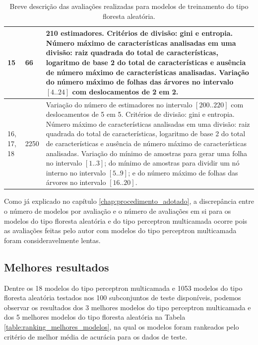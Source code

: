 \begin{table}[ht!]
\begin{center}
{\begin{tabular}{|p{1.5cm}|p{2cm}|p{12cm}|}
    \hline
    15 & 66 & 210 estimadores. Critérios de divisão: gini e entropia. Número máximo de características analisadas em uma divisão: raiz quadrada do total de características, logaritmo de base 2 do total de características e ausência de número máximo de características analisadas. Variação do número máximo de folhas das árvores no intervalo $[4 .. 24]$ com deslocamentos de 2 em 2. \\
    \hline
    16, 17, 18 & 2250 & Variação do número de estimadores no intervalo $[200 .. 220]$ com deslocamentos de 5 em 5. Critérios de divisão: gini e entropia. Número máximo de características analisadas em uma divisão: raiz quadrada do total de características, logaritmo de base 2 do total de características e ausência de número máximo de características analisadas. Variação do mínimo de amostras para gerar uma folha no intervalo $[1 .. 3]$; do mínimo de amostras para dividir um nó interno no intervalo $[5 .. 9]$; e do número máximo de folhas das árvores no intervalo $[16 .. 20]$.  \\
    \hline
    \end{tabular}
  }
  \caption{Breve descrição das avaliações realizadas para modelos de treinamento do tipo floresta aleatória.}
  \label{table:descricao_avaliacoes_floresta_randomica}
  \end{center}
\end{table}

Como já explicado no capítulo \ref{chap:procedimento_adotado}, a discrepância entre o número de modelos por avaliação e o número de avaliações em si para os modelos do tipo floresta aleatória e do tipo perceptron multicamada ocorre pois as avaliações feitas pelo autor com modelos do tipo perceptron multicamada foram consideravelmente lentas.

\subsection{Melhores resultados}

Dentre os 18 modelos do tipo perceptron multicamada e 1053 modelos do tipo floresta aleatória testados nos 100 subconjuntos de teste disponíveis, podemos observar os resultados dos 3 melhores modelos do tipo perceptron multicamada e dos 5 melhores modelos do tipo floresta aleatória na Tabela \ref{table:ranking_melhores_modelos}, na qual os modelos foram rankeados pelo critério de melhor média de acurácia para os dados de teste.

